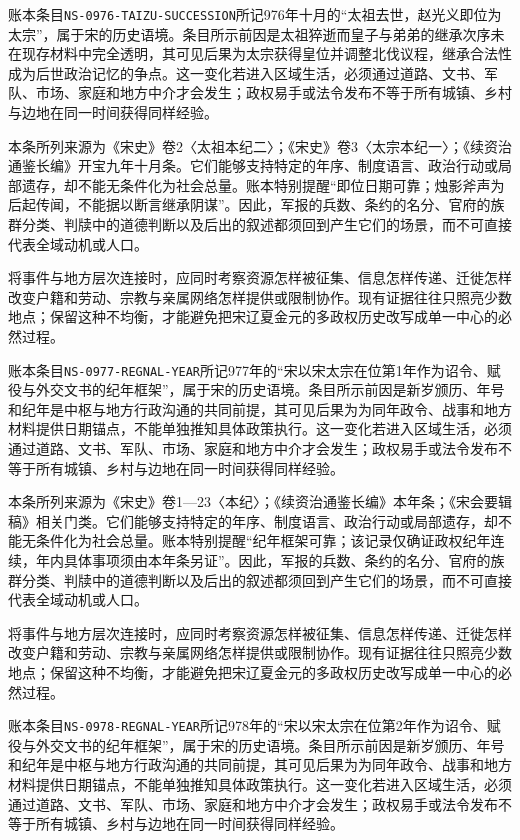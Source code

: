 账本条目\texttt{NS-0976-TAIZU-SUCCESSION}所记976年十月的“太祖去世，赵光义即位为太宗”，属于宋的历史语境。条目所示前因是太祖猝逝而皇子与弟弟的继承次序未在现存材料中完全透明，其可见后果为太宗获得皇位并调整北伐议程，继承合法性成为后世政治记忆的争点。这一变化若进入区域生活，必须通过道路、文书、军队、市场、家庭和地方中介才会发生；政权易手或法令发布不等于所有城镇、乡村与边地在同一时间获得同样经验。

本条所列来源为《宋史》卷2〈太祖本纪二〉；《宋史》卷3〈太宗本纪一〉；《续资治通鉴长编》开宝九年十月条。它们能够支持特定的年序、制度语言、政治行动或局部遗存，却不能无条件化为社会总量。账本特别提醒“即位日期可靠；烛影斧声为后起传闻，不能据以断言继承阴谋”。因此，军报的兵数、条约的名分、官府的族群分类、判牍中的道德判断以及后出的叙述都须回到产生它们的场景，而不可直接代表全域动机或人口。

将事件与地方层次连接时，应同时考察资源怎样被征集、信息怎样传递、迁徙怎样改变户籍和劳动、宗教与亲属网络怎样提供或限制协作。现有证据往往只照亮少数地点；保留这种不均衡，才能避免把宋辽夏金元的多政权历史改写成单一中心的必然过程。

账本条目\texttt{NS-0977-REGNAL-YEAR}所记977年的“宋以宋太宗在位第1年作为诏令、赋役与外交文书的纪年框架”，属于宋的历史语境。条目所示前因是新岁颁历、年号和纪年是中枢与地方行政沟通的共同前提，其可见后果为为同年政令、战事和地方材料提供日期锚点，不能单独推知具体政策执行。这一变化若进入区域生活，必须通过道路、文书、军队、市场、家庭和地方中介才会发生；政权易手或法令发布不等于所有城镇、乡村与边地在同一时间获得同样经验。

本条所列来源为《宋史》卷1—23〈本纪〉；《续资治通鉴长编》本年条；《宋会要辑稿》相关门类。它们能够支持特定的年序、制度语言、政治行动或局部遗存，却不能无条件化为社会总量。账本特别提醒“纪年框架可靠；该记录仅确证政权纪年连续，年内具体事项须由本年条另证”。因此，军报的兵数、条约的名分、官府的族群分类、判牍中的道德判断以及后出的叙述都须回到产生它们的场景，而不可直接代表全域动机或人口。

将事件与地方层次连接时，应同时考察资源怎样被征集、信息怎样传递、迁徙怎样改变户籍和劳动、宗教与亲属网络怎样提供或限制协作。现有证据往往只照亮少数地点；保留这种不均衡，才能避免把宋辽夏金元的多政权历史改写成单一中心的必然过程。

账本条目\texttt{NS-0978-REGNAL-YEAR}所记978年的“宋以宋太宗在位第2年作为诏令、赋役与外交文书的纪年框架”，属于宋的历史语境。条目所示前因是新岁颁历、年号和纪年是中枢与地方行政沟通的共同前提，其可见后果为为同年政令、战事和地方材料提供日期锚点，不能单独推知具体政策执行。这一变化若进入区域生活，必须通过道路、文书、军队、市场、家庭和地方中介才会发生；政权易手或法令发布不等于所有城镇、乡村与边地在同一时间获得同样经验。

